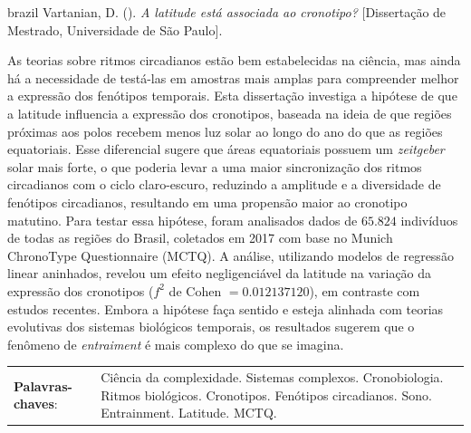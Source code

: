 \documentclass[
12pt,
openright,
oneside,
a4paper,
chapter=TITLE,
section=TITLE,
french,
spanish,
brazil,
english
]{abntex2}\usepackage{array}
\newcommand{\resumoestrangeironame}{Resumo}
\renewcommand{\resumoname}{Abstract}
\renewcommand{\resumoestrangeironame}{Resumo}
\renewcommand{\resumoname}{Resumo}
\renewcommand{\resumoestrangeironame}{Abstract}
\renewcommand{\resumoname}{Resumen}
\renewcommand{\resumoestrangeironame}{Resumo}
\renewcommand{\resumoname}{Résumé}
\renewcommand{\resumoestrangeironame}{Resumo}
\newenvironment{resumoenv}[1][\resumoname]{
  \pretextualchapter{#1}
  \begingroup
  \setlength{\parindent}{0cm}
  \setlength{\parskip}{\smallskipamount} %
  \AtBeginEnvironment{tabular}{\normalsize}
  \renewcommand{\arraystretch}{1}
  \setlength{\aboverulesep}{0ex}
  \setlength{\belowrulesep}{0ex}
  \setlength{\arrayrulewidth}{0pt}
  \setlength{\tabcolsep}{0cm}
  \vspace{-\smallskipamount} %
  \begin{SingleSpace}
}{
  \end{SingleSpace}
  \cleardoublepage
  \endgroup
}
\begin{document}

\begin{resumoenv}[\resumoestrangeironame]
\begin{otherlanguage*}{brazil}
Vartanian, D. ({\imprimirdata}). \textit{A latitude está associada ao cronotipo?} [Dissertação de Mestrado, Universidade de São Paulo].


As teorias sobre ritmos circadianos estão bem estabelecidas na ciência,
mas ainda há a necessidade de testá-las em amostras mais amplas para
compreender melhor a expressão dos fenótipos temporais. Esta dissertação
investiga a hipótese de que a latitude influencia a expressão dos
cronotipos, baseada na ideia de que regiões próximas aos polos recebem
menos luz solar ao longo do ano do que as regiões equatoriais. Esse
diferencial sugere que áreas equatoriais possuem um \emph{zeitgeber}
solar mais forte, o que poderia levar a uma maior sincronização dos
ritmos circadianos com o ciclo claro-escuro, reduzindo a amplitude e a
diversidade de fenótipos circadianos, resultando em uma propensão maior
ao cronotipo matutino. Para testar essa hipótese, foram analisados dados
de \(65.824\) indivíduos de todas as regiões do Brasil, coletados em
2017 com base no Munich ChronoType Questionnaire (MCTQ). A análise,
utilizando modelos de regressão linear aninhados, revelou um efeito
negligenciável da latitude na variação da expressão dos cronotipos
(\(f^2\) de Cohen \(= 0.012137120\)), em contraste com estudos recentes.
Embora a hipótese faça sentido e esteja alinhada com teorias evolutivas
dos sistemas biológicos temporais, os resultados sugerem que o fenômeno
de \emph{entraiment} é mais complexo do que se imagina.


\begin{tabular}{p{3.6cm} p{12.3cm}}
  \textbf{Palavras-chaves}: &  Ciência da complexidade. Sistemas complexos. Cronobiologia. Ritmos biológicos. Cronotipos. Fenótipos circadianos. Sono. Entrainment. Latitude. MCTQ.
\end{tabular}
\end{otherlanguage*}
\end{resumoenv}
\end{document}
